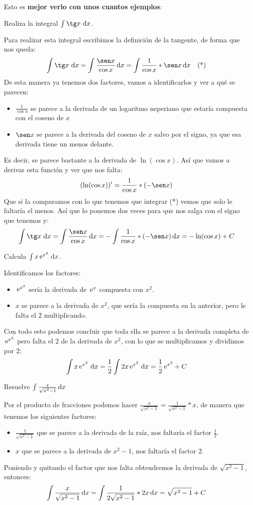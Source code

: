 \documentclass[a4paper,11pt,answers]{exam}
\begin{document}
Esto es \textbf{mejor verlo con unos cuantos ejemplos}:
\begin{questions}
\question Realiza la integral $\int \tg x \ \dif{x}$.
\begin{solution}
Para realizar esta integral escribimos la definición de la tangente, de forma que nos queda:
\[\int \tg x \  \dif{x} = \int \frac{\sen x }{\cos x}\, \dif{x} = \int \frac{1}{\cos x} *\sen x\,\dif{x}\quad \text{(*)}\]
De esta manera ya tenemos dos factores, vamos a identificarlos y ver a qué se parecen:
\begin{itemize}
	\item $\frac{1}{\cos x}$ se parece a la derivada de un logaritmo neperiano que estaría compuesta con el coseno de $x$
	\item $\sen x$ se parece a la derivada del coseno de $x$ salvo por el signo, ya que esa derivada tiene un menos delante.
\end{itemize}
Es decir, se parece bastante a la derivada de $\ln (\cos x)$. Así que vamos a derivar esta función y ver que nos falta:
\[(\ln (\cos x))' = \frac{1}{\cos x} *(-\sen x)\]
Que si la comparamos con lo que tenemos que integrar (*) vemos que solo le faltaría el menos. Así que lo ponemos dos veces para que nos salga con el signo que tenemos y:
\[\int \tg x \  \dif{x} = \int \frac{\sen x }{\cos x}\, \dif{x} =
-\int \frac{1}{\cos x} *(-\sen x)\, \dif{x}  = -\ln (\cos x) + C\]
\end{solution}

\question Calcula $\int x \e^{x^2}\ \dif{x}$.
\begin{solution}
Identificamos los factores:
\begin{itemize}
	\item $\,\mathrm{e}^{x^2}$ sería la derivada de $\,\mathrm{e}^x$ compuesta con $x^2$.
	\item $x$ se parece a la derivada de $x^2$, que sería la compuesta en la anterior, pero le falta el 2 multiplicando.
\end{itemize}
Con todo esto podemos concluir que toda ella se parece a la derivada completa de $\,\mathrm{e}^{x^2}$ pero falta el 2 de la derivada de $x^2$, con lo que se multiplicamos y dividimos por 2:
\[\int x \,\mathrm{e}^{x^2}\ \mathrm{d}x = \frac{1}{2} \int 2x \,\mathrm{e}^{x^2}\ \mathrm{d}x = \frac{1}{2}\,\mathrm{e}^{x^2} + C\]
\end{solution}

\question Resuelve $\int \frac{x}{\sqrt{x^2 - 1}}\, \mathrm{d}x$
\begin{solution}
Por el producto de fracciones podemos hacer $\frac{x}{\sqrt{x^2 - 1}} = \frac{1}{\sqrt{x^2 - 1}} * x$, de manera que tenemos los siguientes factores:
\begin{itemize}
	\item $\frac{1}{\sqrt{x^2 - 1}}$ que se parece a la derivada de la raíz, nos faltaría el factor $\frac{1}{2}$.
	\item $x$ que se parece a la derivada de $x^2-1$, nos faltaría el factor $2$.
\end{itemize}
Poniendo y quitando el factor que nos falta obtendremos la derivada de $\sqrt{x^2 - 1}$, entonces:
\[\int \frac{x}{\sqrt{x^2 - 1}}\, \mathrm{d}x = \int \frac{1}{2\sqrt{x^2 - 1}} * 2x\, \mathrm{d}x = \sqrt{x^2 - 1} + C\]
\end{solution}
\end{questions}
\end{document}
